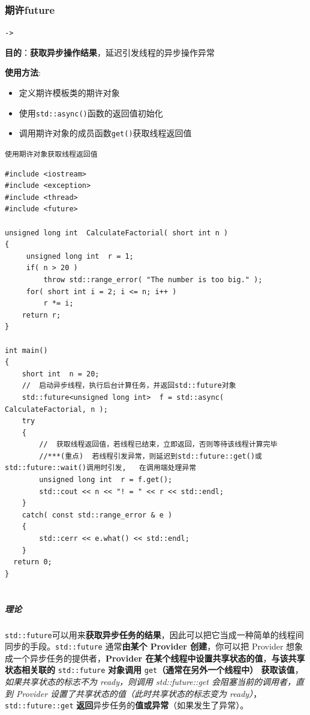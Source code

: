 \documentclass[UTF8,a4paper,12pt]{ctexbook}
\begin{document}
		\subsubsection{期许future}\verb|->|
		
			\textbf{目的}：\textbf{获取异步操作结果}，延迟引发线程的异步操作异常
			
			\textbf{使用方法}:
				\begin{itemize}[itemindent = 2em]
					\item 定义期许模板类的期许对象
					\item 使用\verb|std::async()|函数的返回值初始化
					\item 调用期许对象的成员函数\verb|get()|获取线程返回值
				\end{itemize}
			
			\verb|使用期许对象获取线程返回值|
			\begin{lstlisting}
#include <iostream>
#include <exception>
#include <thread>
#include <future>
	
unsigned long int  CalculateFactorial( short int n )
{
	 unsigned long int  r = 1;
	 if( n > 20 )
		 throw std::range_error( "The number is too big." );
	 for( short int i = 2; i <= n; i++ )
		 r *= i;
	return r;
}

int main()
{
	short int  n = 20;
	//  启动异步线程，执行后台计算任务，并返回std::future对象
    std::future<unsigned long int>  f = std::async( CalculateFactorial, n );
    try
    {
        //  获取线程返回值，若线程已结束，立即返回，否则等待该线程计算完毕
        //***(重点)  若线程引发异常，则延迟到std::future::get()或std::future::wait()调用时引发,   在调用端处理异常
	    unsigned long int  r = f.get();
	    std::cout << n << "! = " << r << std::endl;
	}
	catch( const std::range_error & e )  
	{
	    std::cerr << e.what() << std::endl;
    }
  return 0;
}
	
			\end{lstlisting}
			
			\subparagraph{理论}	
			\verb|std::future|可以用来\textbf{获取异步任务的结果}，因此可以把它当成一种简单的线程间同步的手段。\verb|std::future| 通常\textbf{由某个 Provider 创建}，你可以把 Provider 想象成一个异步任务的提供者，\textbf{Provider 在某个线程中设置共享状态的值}，\textbf{与该共享状态相关联的} \verb|std::future| \textbf{对象调用} \verb|get|\textbf{（通常在另外一个线程中） 获取该值}，\textit{如果共享状态的标志不为 ready，则调用 std::future::get 会阻塞当前的调用者，直到 Provider 设置了共享状态的值（此时共享状态的标志变为 ready）}，\verb|std::future::get| \textbf{返回}异步任务的\textbf{值或异常}（如果发生了异常）。
						
\end{document}
